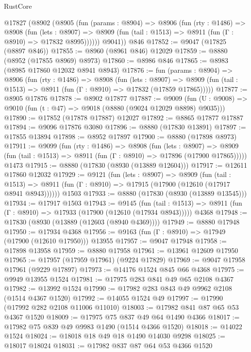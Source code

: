 \begin{lexlean}{RustCore}
\begin{coremodule}
    @17827
      (@8902
        (@8905
          (fun (params : @8904) =>
          @8906
            (fun (rty : @1486) =>
            @8908
              (fun (lets : @8907) =>
              @8909 (fun (tail : @1513) => @8911 (fun (Γ : @8910) => @17832 @8995))))))
        @9041))
    @846
@17852 := @9047 (@17825 (@8897 @846))
@17855 := @8960 (@8961 @846) @12029
@17859 := @8880 (@8952 (@17855 @8969) @8973)
@17860 := @8986 @846
@17865 := @8983 (@8985 @17860 @12032 @8941 @8943)
@17876 := fun (params : @8904) =>
  @8906
    (fun (rty : @1486) =>
    @8908
      (fun (lets : @8907) =>
      @8909 (fun (tail : @1513) => @8911 (fun (Γ : @8910) => @17832 (@17859 @17865)))))
@17877 := @8905 @17876
@17878 := @8902 @17877
@17887 := @9009
    (fun (U : @9008) => @9010 (fun (t : @47) => @9018 (@8880 (@9024 @12029 @8898) @9035)))
@17890 := @17852 (@17878 @17887) @12027
@17892 := @8865 @17877 @17887
@17894 := @9096 @17876 @3080
@17896 := @8880 (@17830 @13891)
@17897 := @17855 @13894
@17898 := @8952 @17897
@17900 := @8880 (@17898 @8973)
@17911 := @9099
    (fun (rty : @1486) =>
    @8908
      (fun (lets : @8907) =>
      @8909 (fun (tail : @1513) => @8911 (fun (Γ : @8910) => @17896 (@17900 @17865)))))
    @1473
@17915 := @8880 (@17830 (@8930 (@13889 @12604)))
@17917 := @12611 @17860 @12032
@17929 := @9121
    (fun (lets : @8907) =>
    @8909
      (fun (tail : @1513) =>
      @8911 (fun (Γ : @8910) => @17915 (@17900 (@12610 (@17917 @8941 @8943))))))
    @1503
@17933 := @8880 (@17830 (@8930 (@13889 @13545)))
@17934 := @17917 @1503
@17943 := @9145
    (fun (tail : @1513) => @8911 (fun (Γ : @8910) => @17933 (@17900 (@12610 (@17934 @8943)))))
    @4368
@17948 := @17830 (@8930 (@13889 (@12603 (@8940 @4369))))
@17949 := @8880 @17948
@17950 := @17934 @4368
@17956 := @9163 (fun (Γ : @8910) => @17949 (@17900 (@12610 @17950))) @13955
@17957 := @9047 @17948
@17958 := @17898 @13958
@17959 := @8880 @17958
@17961 := @13961 @12609 @17950
@17965 := @17957 (@17959 @17961) (@9224 @17829)
@17969 := @9047 @17958 @17961 (@9229 @17897)
@17973 := @14176 @1524 @845 @66 @4368
@17975 := @9949 @13955 @1524
@17981 := @17975 @283 @841 @49 @65 @2108 @4367
@17982 := @13992 @1524
@17990 := @17982 @283 @843 @49 @9962 @2108 (@1514 @4367 @1520)
@17992 := @14055 @1524 @49
@17997 := @17990 (@17992 @282 @2108 @11006 @11010)
@18003 := @17982 @841 @87 @65 @53 @4367 @1520
@18009 := @17975 @75 @837 @49 @64 @1490 @4366
@18017 := @17982 @75 @839 @49 @9983 @1490 (@1514 @4366 @1520)
@18018 := @14022 @1524
@18024 := @18018 @18 @49 @18 @1490 @14030 @9298
@18025 := @18017 @18024
@18031 := @17982 @837 @87 @64 @53 @4366 @1520

\end{coremodule}
\end{lexlean}
